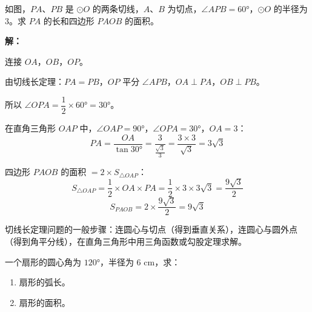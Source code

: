 \documentclass[12pt, a4paper]{ctexart}
\begin{document}
\vspace{6pt}

\begin{examplebox}[【例题5】切线长定理的综合应用]
如图，$PA$、$PB$ 是 $\odot O$ 的两条切线，$A$、$B$ 为切点，$\angle APB = 60°$，$\odot O$ 的半径为 $3$。求 $PA$ 的长和四边形 $PAOB$ 的面积。

\begin{center}
\end{center}
\end{examplebox}

\textbf{解：}

连接 $OA$，$OB$，$OP$。

由切线长定理：$PA = PB$，$OP$ 平分 $\angle APB$，$OA \perp PA$，$OB \perp PB$。

所以 $\angle OPA = \dfrac{1}{2} \times 60° = 30°$。

在直角三角形 $OAP$ 中，$\angle OAP = 90°$，$\angle OPA = 30°$，$OA = 3$：
\[
PA = \frac{OA}{\tan 30°} = \frac{3}{\frac{\sqrt{3}}{3}} = \frac{3 \times 3}{\sqrt{3}} = 3\sqrt{3}
\]

四边形 $PAOB$ 的面积 $= 2 \times S_{\triangle OAP}$：
\[
S_{\triangle OAP} = \frac{1}{2} \times OA \times PA = \frac{1}{2} \times 3 \times 3\sqrt{3} = \frac{9\sqrt{3}}{2}
\]
\[
S_{PAOB} = 2 \times \frac{9\sqrt{3}}{2} = 9\sqrt{3}
\]

\begin{tipbox}[方法总结]
切线长定理问题的一般步骤：连圆心与切点（得到垂直关系），连圆心与圆外点（得到角平分线），在直角三角形中用三角函数或勾股定理求解。
\end{tipbox}

\vspace{6pt}

\begin{examplebox}[【例题6】弧长与扇形面积计算]
一个扇形的圆心角为 $120°$，半径为 $6$ cm，求：
\begin{enumerate}[label=(\arabic*)]
  \item 扇形的弧长。
  \item 扇形的面积。
\end{enumerate}
\end{examplebox}
\end{document}
